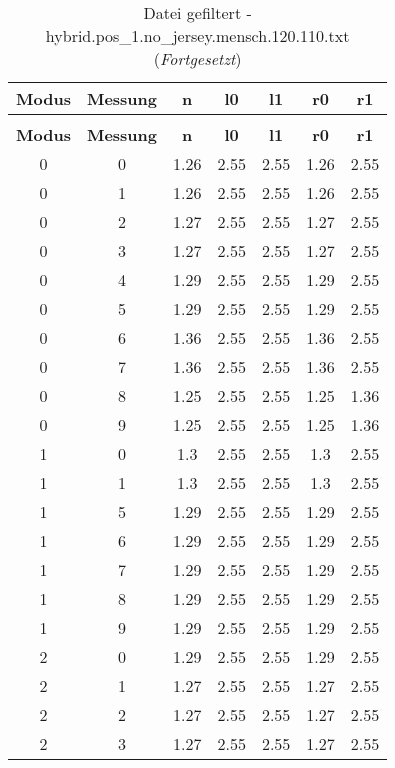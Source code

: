 \begin{longtable}{|c|c||c||c|c||c|c|}
	\caption{Datei gefiltert - hybrid.pos\_1.no\_jersey.mensch.120.110.txt} \label{tab:hybrid.pos-1.no-jersey.mensch.120.110.txt} \\ \hline
	\textbf{Modus} & \textbf{Messung} & \textbf{n} & \textbf{l0} & \textbf{l1} & \textbf{r0} & \textbf{r1}\\ \hline
	\endfirsthead
	\caption[]{Datei gefiltert - hybrid.pos\_1.no\_jersey.mensch.120.110.txt (\emph{Fortgesetzt})} \\ \hline
	\textbf{Modus} & \textbf{Messung} & \textbf{n} & \textbf{l0} & \textbf{l1} & \textbf{r0} & \textbf{r1}\\ \hline
	\endhead
	0 & 0 & 1.26 & 2.55 & 2.55 & 1.26 & 2.55 \\ \hline
	0 & 1 & 1.26 & 2.55 & 2.55 & 1.26 & 2.55 \\ \hline
	0 & 2 & 1.27 & 2.55 & 2.55 & 1.27 & 2.55 \\ \hline
	0 & 3 & 1.27 & 2.55 & 2.55 & 1.27 & 2.55 \\ \hline
	0 & 4 & 1.29 & 2.55 & 2.55 & 1.29 & 2.55 \\ \hline
	0 & 5 & 1.29 & 2.55 & 2.55 & 1.29 & 2.55 \\ \hline
	0 & 6 & 1.36 & 2.55 & 2.55 & 1.36 & 2.55 \\ \hline
	0 & 7 & 1.36 & 2.55 & 2.55 & 1.36 & 2.55 \\ \hline
	0 & 8 & 1.25 & 2.55 & 2.55 & 1.25 & 1.36 \\ \hline
	0 & 9 & 1.25 & 2.55 & 2.55 & 1.25 & 1.36 \\ \hline
	1 & 0 & 1.3 & 2.55 & 2.55 & 1.3 & 2.55 \\ \hline
	1 & 1 & 1.3 & 2.55 & 2.55 & 1.3 & 2.55 \\ \hline
	1 & 5 & 1.29 & 2.55 & 2.55 & 1.29 & 2.55 \\ \hline
	1 & 6 & 1.29 & 2.55 & 2.55 & 1.29 & 2.55 \\ \hline
	1 & 7 & 1.29 & 2.55 & 2.55 & 1.29 & 2.55 \\ \hline
	1 & 8 & 1.29 & 2.55 & 2.55 & 1.29 & 2.55 \\ \hline
	1 & 9 & 1.29 & 2.55 & 2.55 & 1.29 & 2.55 \\ \hline
	2 & 0 & 1.29 & 2.55 & 2.55 & 1.29 & 2.55 \\ \hline
	2 & 1 & 1.27 & 2.55 & 2.55 & 1.27 & 2.55 \\ \hline
	2 & 2 & 1.27 & 2.55 & 2.55 & 1.27 & 2.55 \\ \hline
	2 & 3 & 1.27 & 2.55 & 2.55 & 1.27 & 2.55 \\ \hline

\end{longtable}
